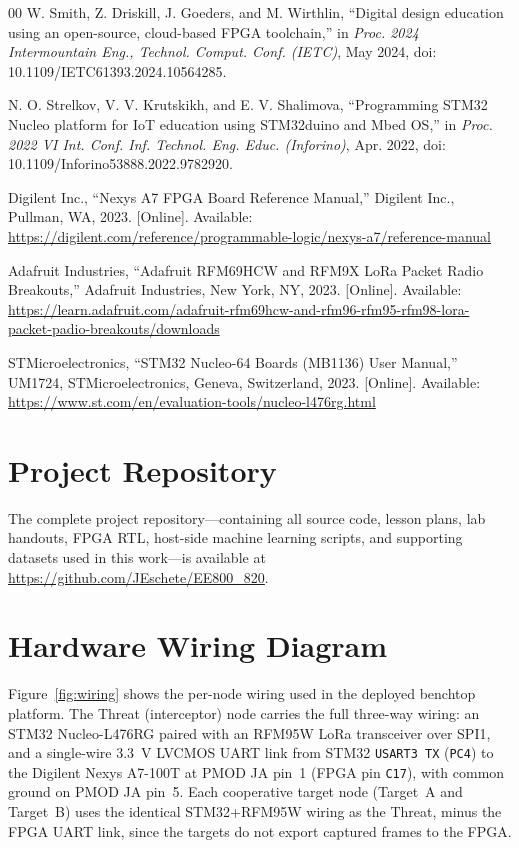 \documentclass[conference]{IEEEtran}
\begin{document}
\begin{thebibliography}{00}
W. Smith, Z. Driskill, J. Goeders, and M. Wirthlin, ``Digital design education using an open-source, cloud-based FPGA toolchain,'' in \textit{Proc. 2024 Intermountain Eng., Technol. Comput. Conf. (IETC)}, May 2024, doi: 10.1109/IETC61393.2024.10564285. %

N. O. Strelkov, V. V. Krutskikh, and E. V. Shalimova, ``Programming STM32 Nucleo platform for IoT education using STM32duino and Mbed OS,'' in \textit{Proc. 2022 VI Int. Conf. Inf. Technol. Eng. Educ. (Inforino)}, Apr. 2022, doi: 10.1109/Inforino53888.2022.9782920. %

Digilent Inc., ``Nexys A7 FPGA Board Reference Manual,'' Digilent Inc., Pullman, WA, 2023. [Online]. Available: \url{https://digilent.com/reference/programmable-logic/nexys-a7/reference-manual} %

Adafruit Industries, ``Adafruit RFM69HCW and RFM9X LoRa Packet Radio Breakouts,'' Adafruit Industries, New York, NY, 2023. [Online]. Available: \url{https://learn.adafruit.com/adafruit-rfm69hcw-and-rfm96-rfm95-rfm98-lora-packet-padio-breakouts/downloads} %

STMicroelectronics, ``STM32 Nucleo-64 Boards (MB1136) User Manual,'' UM1724, STMicroelectronics, Geneva, Switzerland, 2023. [Online]. Available: \url{https://www.st.com/en/evaluation-tools/nucleo-l476rg.html} %

\end{thebibliography}

\appendices

\section{Project Repository}\label{app:repo}

The complete project repository---containing all source code, lesson plans, lab handouts, FPGA RTL, host-side machine learning scripts, and supporting datasets used in this work---is available at \url{https://github.com/JEschete/EE800_820}.

\section{Hardware Wiring Diagram}\label{app:wiring}

Figure~\ref{fig:wiring} shows the per-node wiring used in the deployed benchtop platform. The Threat (interceptor) node carries the full three-way wiring: an STM32 Nucleo-L476RG paired with an RFM95W LoRa transceiver over SPI1, and a single-wire 3.3~V LVCMOS UART link from STM32 \texttt{USART3 TX} (\texttt{PC4}) to the Digilent Nexys A7-100T at PMOD JA pin~1 (FPGA pin \texttt{C17}), with common ground on PMOD JA pin~5. Each cooperative target node (Target~A and Target~B) uses the identical STM32+RFM95W wiring as the Threat, minus the FPGA UART link, since the targets do not export captured frames to the FPGA.
\end{document}

